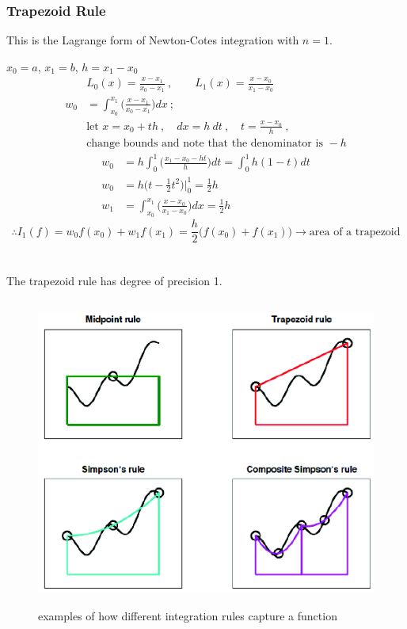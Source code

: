 \documentclass[12pt, answers]{exam}
\begin{document}
\subsubsection*{Trapezoid Rule}
This is the Lagrange form of Newton-Cotes integration with $n=1$.

$x_0 = a$, $x_1 = b$, $h = x_1 - x_0$
%
\begin{align*}
&L_0(x) = \frac{x-x_1}{x_0-x_1}\:, \qquad L_1(x) = \frac{x-x_0}{x_1-x_0} \\
%
w_0 &= \int_{x_0}^{x_1} \bigl(\frac{x-x_1}{x_0-x_1}\bigr) dx\:; 
\\ &\text{let } x = x_0 + th  \:, \quad dx = h\:dt\:, \quad t = \frac{x-x_0}{h}\:,\\
&\text{change bounds and note that the denominator is }-h 
\end{align*}
\begin{align*}
w_0 &= h \int_0^1 \bigl(\frac{x_1 - x_0 - ht}{h}\bigr)dt = \int_0^1 h(1-t)dt \\
%
w_0 &= h\bigl(t - \frac{1}{2}t^2 \bigr) |_0^1 = \frac{1}{2}h\\
%
w_1 &= \int_{x_0}^{x_1} \bigl(\frac{x-x_0}{x_1-x_0}\bigr) dx = \frac{1}{2}h
%
\end{align*}
\ifprintanswers
\[\therefore I_1(f) = w_0f(x_0) + w_1f(x_1)  = \boxed{\frac{h}{2}\bigl(f(x_0) + f(x_1)\bigr)} \rightarrow \text{area of a trapezoid}
\]
\else
\\\vspace*{2em}\\
\fi
%
The trapezoid rule has degree of precision 1.

\begin{figure}
\begin{center}
  \includegraphics[height=4in,clip]{QuadratureComparison}
\end{center}
\caption{examples of how different integration rules capture a function}
\end{figure}
\end{document}

